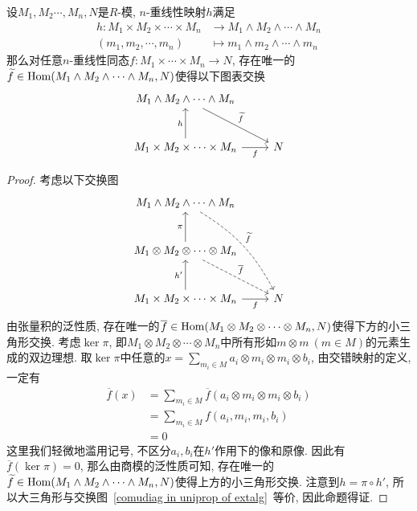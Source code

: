 \begin{prop}\label{uni_prop of ext_prod}
    设$M_1,M_2\cdots,M_n,N$是$R$-模, $n$-重线性映射$h$满足
    \begin{align*}
        h:M_1\times M_2\times\cdots\times M_n&\to M_1\wedge M_2\wedge\cdots\wedge M_n\\
        (m_1,m_2,\cdots,m_n)&\mapsto m_1\wedge m_2\wedge\cdots\wedge m_n
    \end{align*}
    那么对任意$n$-重线性同态$f:M_1\times\cdots\times M_n\to N$, 存在唯一的$\widetilde{f}\in\operatorname{Hom}(M_1\wedge M_2\wedge\cdots\wedge M_n,N)$使得以下图表交换
    \begin{equation}
        \begin{tikzcd}[row sep=large]
            M_1\wedge M_2\wedge\cdots\wedge M_n  \arrow[dr, "\widetilde{f}"] & \\
            M_1\times M_2\times\cdots\times M_n \arrow[u, "h"] \arrow[r, "f"'] & N
        \end{tikzcd}\label{comudiag in uniprop of extalg}
    \end{equation}
\end{prop}
\begin{proof}
    考虑以下交换图
    \[\begin{tikzcd}[row sep=large]
        M_1\wedge M_2\wedge\cdots\wedge M_n \arrow[ddr, dashed, bend left=15, "\widetilde{f}"] & \\
        M_1\otimes M_2\otimes\cdots\otimes M_n \arrow[u, "\pi"] \arrow[dr, dashed, "\overline{f}"] & \\
        M_1\times M_2\times\cdots\times M_n \arrow[u, "h'"] \arrow[r, "f"'] & N
    \end{tikzcd}\]
    由张量积的泛性质, 存在唯一的$\overline{f}\in\operatorname{Hom}(M_1\otimes M_2\otimes\cdots\otimes M_n,N)$使得下方的小三角形交换.
    考虑$\ker\pi$, 即$M_1\otimes M_2\otimes\cdots\otimes M_n$中所有形如$m\otimes m\ (m\in M)$的元素生成的双边理想.
    取$\ker\pi$中任意的$\displaystyle x=\sum_{m_i\in M}a_i\otimes m_i\otimes m_i\otimes b_i$, 由交错映射的定义, 一定有
    \begin{align*}
        \overline{f}(x)&=\sum_{m_i\in M}\overline{f}(a_i\otimes m_i\otimes m_i\otimes b_i)\\
        &=\sum_{m_i\in M}f(a_i,m_i,m_i,b_i)\\
        &=0
    \end{align*}
    这里我们轻微地滥用记号, 不区分$a_i,b_i$在$h'$作用下的像和原像.
    因此有$\overline{f}(\ker\pi)=0$, 那么由商模的泛性质可知, 存在唯一的$\widetilde{f}\in\operatorname{Hom}(M_1\wedge M_2\wedge\cdots\wedge M_n,N)$使得上方的小三角形交换.
    注意到$h=\pi\circ h'$, 所以大三角形与交换图~\eqref{comudiag in uniprop of extalg}~等价, 因此命题得证.
\end{proof}

